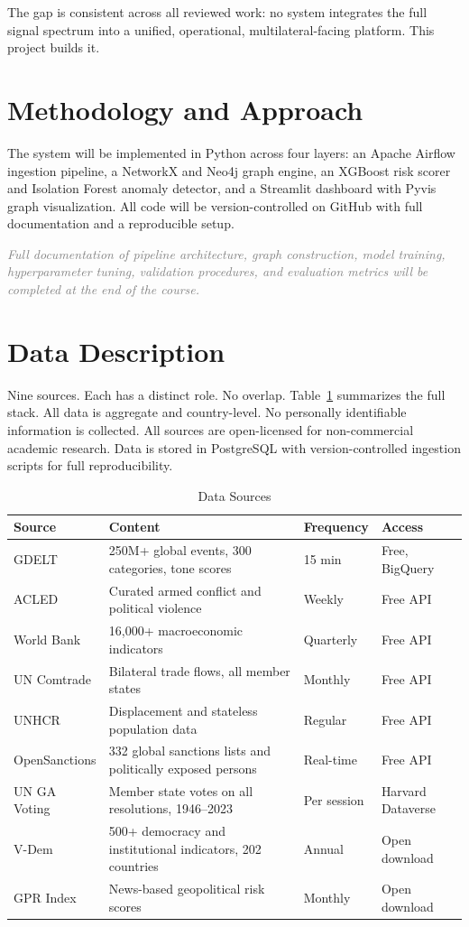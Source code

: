 \documentclass[12pt, onecolumn]{IEEEtran}
\newcommand{\placeholder}[1]{\textit{\textcolor{gray}{#1}}}
\begin{document}
The gap is consistent across all reviewed work: no system integrates the full signal spectrum into a unified, operational, multilateral-facing platform. This project builds it.


\section{Methodology and Approach}

The system will be implemented in Python across four layers: an Apache Airflow ingestion pipeline, a NetworkX and Neo4j graph engine, an XGBoost risk scorer and Isolation Forest anomaly detector, and a Streamlit dashboard with Pyvis graph visualization. All code will be version-controlled on GitHub with full documentation and a reproducible setup.

\placeholder{Full documentation of pipeline architecture, graph construction, model training, hyperparameter tuning, validation procedures, and evaluation metrics will be completed at the end of the course.}


\section{Data Description}

Nine sources. Each has a distinct role. No overlap. Table~\ref{tab:sources} summarizes the full stack. All data is aggregate and country-level. No personally identifiable information is collected. All sources are open-licensed for non-commercial academic research. Data is stored in PostgreSQL with version-controlled ingestion scripts for full reproducibility.

\begin{table}[ht]
\caption{Data Sources}
\label{tab:sources}
\centering
\renewcommand{\arraystretch}{1.3}
\begin{tabular}{p{2.4cm} p{3.8cm} p{1.6cm} p{1.8cm}}
\toprule
\textbf{Source} & \textbf{Content} & \textbf{Frequency} & \textbf{Access} \\
\midrule
GDELT & 250M+ global events, 300 categories, tone scores & 15 min & Free, BigQuery \\
ACLED & Curated armed conflict and political violence & Weekly & Free API \\
World Bank & 16,000+ macroeconomic indicators & Quarterly & Free API \\
UN Comtrade & Bilateral trade flows, all member states & Monthly & Free API \\
UNHCR & Displacement and stateless population data & Regular & Free API \\
OpenSanctions & 332 global sanctions lists and politically exposed persons & Real-time & Free API \\
UN GA Voting & Member state votes on all resolutions, 1946--2023 & Per session & Harvard Dataverse \\
V-Dem & 500+ democracy and institutional indicators, 202 countries & Annual & Open download \\
GPR Index & News-based geopolitical risk scores & Monthly & Open download \\
\bottomrule
\end{tabular}
\end{table}
\end{document}
